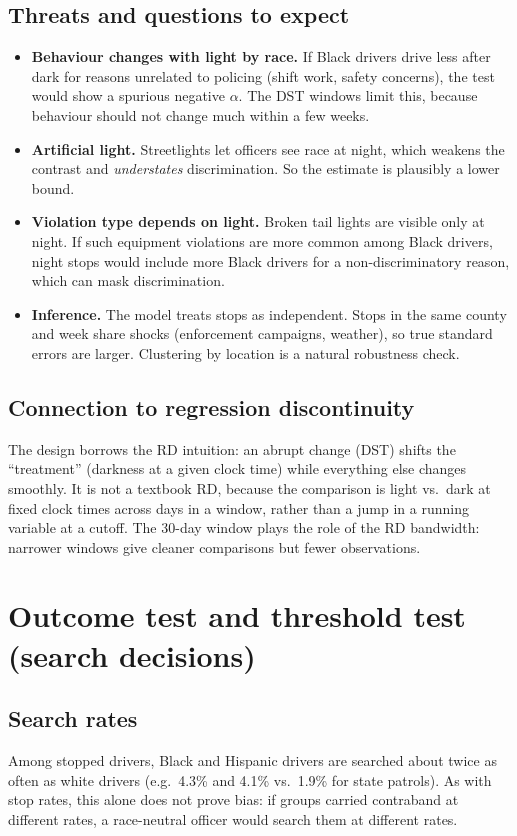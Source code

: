 \documentclass[11pt]{article}
\newcommand{\1}{\mathbf{1}}
\begin{document}
\subsection{Threats and questions to expect}
\begin{itemize}
  \item \textbf{Behaviour changes with light by race.} If Black drivers drive less after dark for reasons unrelated to policing (shift work, safety concerns), the test would show a spurious negative $\alpha$. The DST windows limit this, because behaviour should not change much within a few weeks.
  \item \textbf{Artificial light.} Streetlights let officers see race at night, which weakens the contrast and \emph{understates} discrimination. So the estimate is plausibly a lower bound.
  \item \textbf{Violation type depends on light.} Broken tail lights are visible only at night. If such equipment violations are more common among Black drivers, night stops would include more Black drivers for a non-discriminatory reason, which can mask discrimination.
  \item \textbf{Inference.} The model treats stops as independent. Stops in the same county and week share shocks (enforcement campaigns, weather), so true standard errors are larger. Clustering by location is a natural robustness check.
\end{itemize}

\subsection{Connection to regression discontinuity}
The design borrows the RD intuition: an abrupt change (DST) shifts the ``treatment'' (darkness at a given clock time) while everything else changes smoothly. It is not a textbook RD, because the comparison is light vs.\ dark at fixed clock times across days in a window, rather than a jump in a running variable at a cutoff. The 30-day window plays the role of the RD bandwidth: narrower windows give cleaner comparisons but fewer observations.

\section{Outcome test and threshold test (search decisions)}

\subsection{Search rates}
Among stopped drivers, Black and Hispanic drivers are searched about twice as often as white drivers (e.g.\ 4.3\% and 4.1\% vs.\ 1.9\% for state patrols). As with stop rates, this alone does not prove bias: if groups carried contraband at different rates, a race-neutral officer would search them at different rates.
\end{document}
